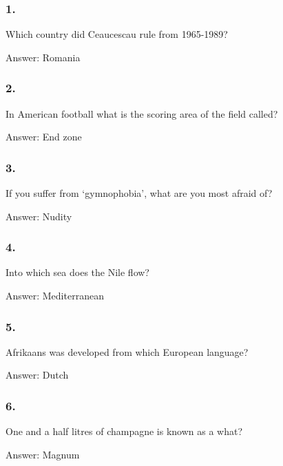 \documentclass{beamer}
\begin{document}
    \begin{frame}
        \frametitle{1.}
        Which country did Ceaucescau rule from 1965-1989?\\

        \begin{center}
            Answer: Romania
        \end{center}
    \end{frame}

    \begin{frame}
        \frametitle{2.}
        In American football what is the scoring area of the field called?\\

        \begin{center}
            Answer: End zone
        \end{center}
    \end{frame}

    \begin{frame}
        \frametitle{3.}
        If you suffer from `gymnophobia', what are you most afraid of?\\

        \begin{center}
            Answer: Nudity
        \end{center}
    \end{frame}

    \begin{frame}
        \frametitle{4.}
        Into which sea does the Nile flow?\\

        \begin{center}
            Answer: Mediterranean
        \end{center}
    \end{frame}

    \begin{frame}
        \frametitle{5.}
        Afrikaans was developed from which European language?\\

        \begin{center}
            Answer: Dutch
        \end{center}
    \end{frame}

    \begin{frame}
        \frametitle{6.}
        One and a half litres of champagne is known as a what?\\

        \begin{center}
            Answer: Magnum
        \end{center}
    \end{frame}
\end{document}
